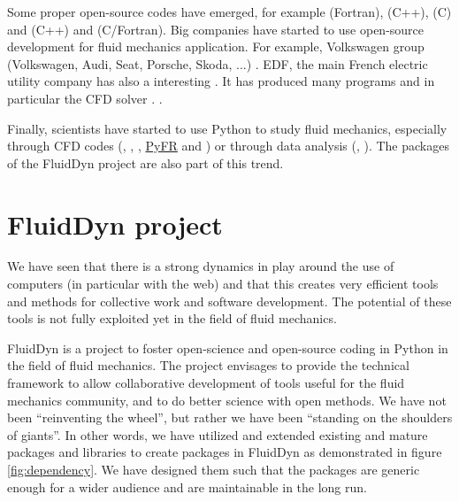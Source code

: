 Some proper open-source codes have emerged, for example
 (Fortran),
 (C++),
 (C) and
 (C++) and
 (C/Fortran).
%
Big companies have started to use open-source development for fluid mechanics
application. For example, Volkswagen group (Volkswagen, Audi, Seat, Porsche,
Skoda, ...) .
%
EDF, the main French electric utility company has also a interesting
. It has produced many programs and in particular the CFD
solver .
%
.

Finally, scientists have started to use Python to study fluid mechanics,
especially through CFD codes (,
,
, \href{http://pyfr.org/}{PyFR}
and ) or through data analysis
(,
).
%
The packages of the FluidDyn project are also part of this trend.

\section{FluidDyn project}
We have seen that there is a strong dynamics in play around the use of
computers (in particular with the web) and that this creates very efficient
tools and methods for collective work and software development.
%
The potential of these tools is not fully exploited yet in the field of fluid
mechanics.

FluidDyn is a project to foster open-science and open-source coding in Python
in the field of fluid mechanics.
%
The project envisages to provide the technical framework to allow collaborative
development of tools useful for the fluid mechanics community, and to do better
science with open methods.
%
We have not been ``reinventing the wheel'', but rather we have been ``standing
on the shoulders of giants''. In other words, we have utilized and extended
existing and mature packages and libraries to create packages in FluidDyn as
demonstrated in figure \ref{fig:dependency}. We have designed them such that
the packages are generic enough for a wider audience and are maintainable in
the long run.

